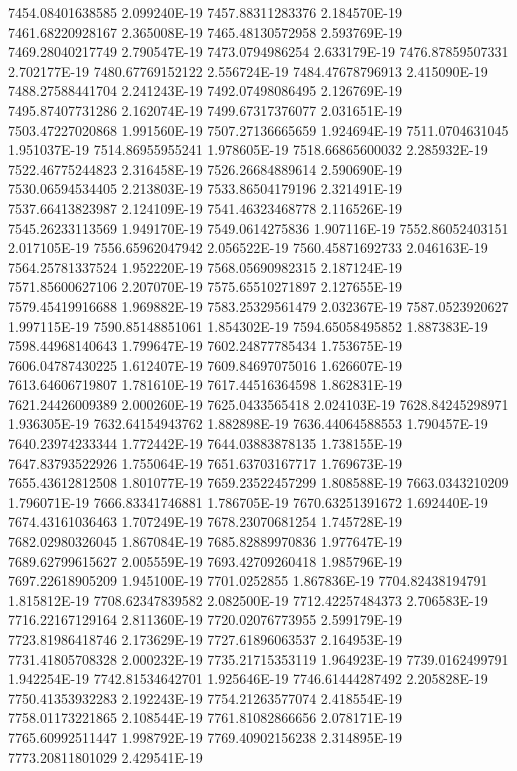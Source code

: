 7454.08401638585  2.099240E-19
7457.88311283376  2.184570E-19
7461.68220928167  2.365008E-19
7465.48130572958  2.593769E-19
7469.28040217749  2.790547E-19
7473.0794986254  2.633179E-19
7476.87859507331  2.702177E-19
7480.67769152122  2.556724E-19
7484.47678796913  2.415090E-19
7488.27588441704  2.241243E-19
7492.07498086495  2.126769E-19
7495.87407731286  2.162074E-19
7499.67317376077  2.031651E-19
7503.47227020868  1.991560E-19
7507.27136665659  1.924694E-19
7511.0704631045  1.951037E-19
7514.86955955241  1.978605E-19
7518.66865600032  2.285932E-19
7522.46775244823  2.316458E-19
7526.26684889614  2.590690E-19
7530.06594534405  2.213803E-19
7533.86504179196  2.321491E-19
7537.66413823987  2.124109E-19
7541.46323468778  2.116526E-19
7545.26233113569  1.949170E-19
7549.0614275836  1.907116E-19
7552.86052403151  2.017105E-19
7556.65962047942  2.056522E-19
7560.45871692733  2.046163E-19
7564.25781337524  1.952220E-19
7568.05690982315  2.187124E-19
7571.85600627106  2.207070E-19
7575.65510271897  2.127655E-19
7579.45419916688  1.969882E-19
7583.25329561479  2.032367E-19
7587.0523920627  1.997115E-19
7590.85148851061  1.854302E-19
7594.65058495852  1.887383E-19
7598.44968140643  1.799647E-19
7602.24877785434  1.753675E-19
7606.04787430225  1.612407E-19
7609.84697075016  1.626607E-19
7613.64606719807  1.781610E-19
7617.44516364598  1.862831E-19
7621.24426009389  2.000260E-19
7625.0433565418  2.024103E-19
7628.84245298971  1.936305E-19
7632.64154943762  1.882898E-19
7636.44064588553  1.790457E-19
7640.23974233344  1.772442E-19
7644.03883878135  1.738155E-19
7647.83793522926  1.755064E-19
7651.63703167717  1.769673E-19
7655.43612812508  1.801077E-19
7659.23522457299  1.808588E-19
7663.0343210209  1.796071E-19
7666.83341746881  1.786705E-19
7670.63251391672  1.692440E-19
7674.43161036463  1.707249E-19
7678.23070681254  1.745728E-19
7682.02980326045  1.867084E-19
7685.82889970836  1.977647E-19
7689.62799615627  2.005559E-19
7693.42709260418  1.985796E-19
7697.22618905209  1.945100E-19
7701.0252855  1.867836E-19
7704.82438194791  1.815812E-19
7708.62347839582  2.082500E-19
7712.42257484373  2.706583E-19
7716.22167129164  2.811360E-19
7720.02076773955  2.599179E-19
7723.81986418746  2.173629E-19
7727.61896063537  2.164953E-19
7731.41805708328  2.000232E-19
7735.21715353119  1.964923E-19
7739.0162499791  1.942254E-19
7742.81534642701  1.925646E-19
7746.61444287492  2.205828E-19
7750.41353932283  2.192243E-19
7754.21263577074  2.418554E-19
7758.01173221865  2.108544E-19
7761.81082866656  2.078171E-19
7765.60992511447  1.998792E-19
7769.40902156238  2.314895E-19
7773.20811801029  2.429541E-19
